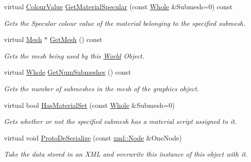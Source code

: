 \begin{DoxyCompactItemize}
virtual \hyperlink{classMezzanine_1_1ColourValue}{ColourValue} \hyperlink{classMezzanine_1_1WorldObjectGraphicsSettings_ad48d0d8471b5310c27b891d5e51b0c7d}{GetMaterialSpecular} (const \hyperlink{namespaceMezzanine_adcbb6ce6d1eb4379d109e51171e2e493}{Whole} \&Submesh=0) const 
\begin{DoxyCompactList}\small\item\em Gets the Specular colour value of the material belonging to the specified submesh. \item\end{DoxyCompactList}\item 
virtual \hyperlink{classMezzanine_1_1Mesh}{Mesh} $\ast$ \hyperlink{classMezzanine_1_1WorldObjectGraphicsSettings_ac45583fcb933c439025237d1d5634ce1}{GetMesh} () const 
\begin{DoxyCompactList}\small\item\em Gets the mesh being used by this \hyperlink{classMezzanine_1_1World}{World} Object. \item\end{DoxyCompactList}\item 
virtual \hyperlink{namespaceMezzanine_adcbb6ce6d1eb4379d109e51171e2e493}{Whole} \hyperlink{classMezzanine_1_1WorldObjectGraphicsSettings_ae1e210b72aac44a75890acdb777baa9c}{GetNumSubmeshes} () const 
\begin{DoxyCompactList}\small\item\em Gets the number of submeshes in the mesh of the graphics ohject. \item\end{DoxyCompactList}\item 
virtual bool \hyperlink{classMezzanine_1_1WorldObjectGraphicsSettings_a90d4e4516181052ea6afcb257a864887}{HasMaterialSet} (const \hyperlink{namespaceMezzanine_adcbb6ce6d1eb4379d109e51171e2e493}{Whole} \&Submesh=0)
\begin{DoxyCompactList}\small\item\em Gets whether or not the specified submesh has a material script assigned to it. \item\end{DoxyCompactList}\item 
virtual void \hyperlink{classMezzanine_1_1WorldObjectGraphicsSettings_a0f3fbc4ea728847e3aa283a360bdf32e}{ProtoDeSerialize} (const \hyperlink{classMezzanine_1_1xml_1_1Node}{xml::Node} \&OneNode)
\begin{DoxyCompactList}\small\item\em Take the data stored in an XML and overwrite this instance of this object with it. \item\end{DoxyCompactList}\item 

\end{DoxyCompactItemize}

